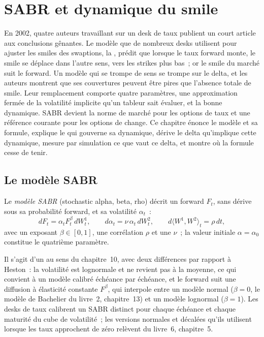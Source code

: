 \chapter{SABR et dynamique du smile}\label{ch:dv:sabr-and-smile-dynamics}

En 2002, quatre auteurs travaillant sur un desk de taux publient un court article aux conclusions
gênantes. Le modèle que de nombreux desks utilisent pour ajuster les smiles des swaptions, la
, prédit que lorsque le taux forward monte, le smile se déplace dans l'autre
sens, vers les strikes plus bas~; or le smile du marché suit le forward. Un modèle qui se trompe
de sens se trompe sur le delta, et les auteurs montrent que ses couvertures peuvent être pires
que l'absence totale de smile. Leur remplacement comporte quatre paramètres, une approximation
fermée de la volatilité implicite qu'un tableur sait évaluer, et la bonne dynamique. SABR devient
la norme de marché pour les options de taux et une référence courante pour les options de change.
Ce chapitre énonce le modèle et sa formule, explique le  qui gouverne sa dynamique, dérive
le delta qu'implique cette dynamique, mesure par simulation ce que vaut ce delta, et montre où la
formule cesse de tenir.

\section{Le modèle SABR}

\begin{definition}\label{def:dv:sabr-and-smile-dynamics:sabr}
Le \emph{modèle SABR} (stochastic alpha, beta, rho) décrit un forward $F_t$,
sans dérive sous sa probabilité forward, et sa volatilité $\alpha_t$~:
\[
dF_t=\alpha_tF_t^{\beta}\,dW^1_t,\qquad d\alpha_t=\nu\,\alpha_t\,dW^2_t,\qquad
d\langle W^1,W^2\rangle_t=\rho\,dt,
\]
avec un exposant $\beta\in[0,1]$, une corrélation $\rho$ et une  $\nu$~; la
valeur initiale $\alpha=\alpha_0$ constitue le quatrième paramètre.
\end{definition}

Il s'agit d'un  au sens du chapitre~10, avec deux différences par
rapport à Heston~: la volatilité est lognormale et ne revient pas à la moyenne, ce qui convient à un
modèle calibré échéance par échéance, et le forward suit une diffusion à élasticité constante
$F^\beta$, qui interpole entre un modèle normal ($\beta=0$, le modèle de Bachelier du livre~2,
chapitre~13) et un modèle lognormal ($\beta=1$). Les desks de taux calibrent un SABR distinct pour
chaque échéance et chaque maturité du cube de volatilité~; les versions normales et décalées
qu'ils utilisent lorsque les taux approchent de zéro relèvent du livre~6, chapitre~5.

